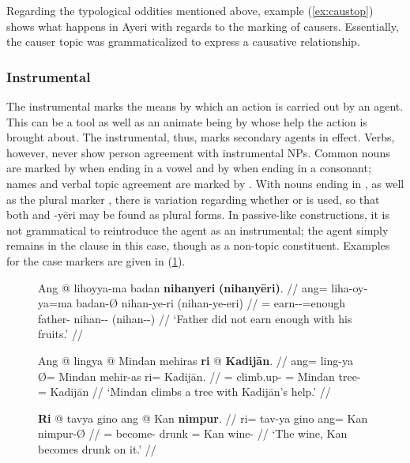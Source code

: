 Regarding the typological oddities mentioned above, example (\ref{ex:caustop}) 
shows what happens in Ayeri with regards to the marking of causers. 
Essentially, the causer topic was grammaticalized to express a causative 
relationship.


\subsubsection{Instrumental}
\label{subsubsec:instrumental}

The instrumental marks the means by which an action is carried out by an agent.
This can be a tool as well as an animate being by whose help the action is
brought about. The instrumental, thus, marks secondary agents in effect. Verbs,
however, never show person agreement with instrumental NPs. Common nouns are
marked by  when ending in a vowel and by 
when ending in a consonant; names and verbal topic agreement are marked by
. With nouns ending in , as well as the plural marker
, there is variation regarding whether  or 
 is used, so that both  and 
{-yēri} may be found as plural forms. In passive-like constructions, it is not
grammatical to reintroduce the agent as an instrumental; the agent simply
remains in the clause in this case, though as a non-topic constituent. Examples
for the case markers are given in (\ref{ex:insmarking}).

\begin{figure}
\pex\label{ex:insmarking}
%
\a\begingl
	\gla Ang @ lihoyya-ma badan \textbf{nihanyeri} 
		\textbf{\textup{(}nihanyēri\textup{)}}. //
	\glb ang= liha-oy-ya=ma badan-Ø nihan-ye-ri (nihan-ye-eri) //
	\glc \AgtT{}= earn-\Neg{}-\TsgM{}=enough father-\Top{} 
		nihan-\Pl{}-\Ins{} (nihan-\Pl{}-\Ins) //
	\glft `Father did not earn enough with his fruits.' //
\endgl

\a\begingl
	\gla Ang @ lingya {} @ Mindan mehiras \textbf{ri} @ \textbf{Kadijān}. //
	\glb ang= ling-ya Ø= Mindan mehir-as ri= Kadijān. //
	\glc \AgtT{}= climb.up-\TsgM{} \Top{}= Mindan tree-\Parg{} 
		\Ins{}= Kadijān //
	\glft `Mindan climbs a tree with Kadijān's help.' //
\endgl

\a\begingl
	\gla \textbf{Ri} @ tavya gino ang @ Kan \textbf{nimpur}. //
	\glb ri= tav-ya gino ang= Kan nimpur-Ø //
	\glc \InsT{}= become-\TsgM{} drunk \Aarg{}= Kan wine-\Top{} //
	\glft `The wine, Kan becomes drunk on it.' //
\endgl
\xe
\end{figure}

